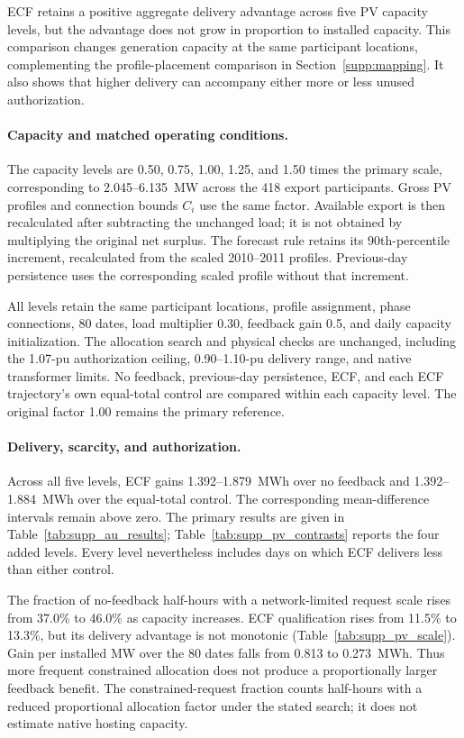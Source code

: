 \documentclass[11pt]{article}
\begin{document}
ECF retains a positive aggregate delivery advantage across five PV capacity
levels, but the advantage does not grow in proportion to installed capacity.
This comparison changes generation capacity at the same participant locations,
complementing the profile-placement comparison in Section~\ref{supp:mapping}.
It also shows that higher delivery can accompany either more or less unused
authorization.

\paragraph{Capacity and matched operating conditions.}
The capacity levels are 0.50, 0.75, 1.00, 1.25, and 1.50 times the primary
scale, corresponding to 2.045--6.135~MW across the 418 export participants.
Gross PV profiles and connection bounds $C_i$ use the same factor.
Available export is then recalculated after subtracting the unchanged load;
it is not obtained by multiplying the original net surplus. The forecast
rule retains its 90th-percentile increment, recalculated from the scaled
2010--2011 profiles. Previous-day persistence uses the corresponding scaled
profile without that increment.

All levels retain the same participant locations, profile assignment, phase
connections, 80 dates, load multiplier 0.30, feedback gain 0.5, and daily
capacity initialization. The allocation search and physical checks are
unchanged, including the 1.07-pu authorization ceiling, 0.90--1.10-pu delivery
range, and native transformer limits. No feedback, previous-day persistence,
ECF, and each ECF trajectory's own equal-total control are compared within
each capacity level. The original factor 1.00 remains the primary reference.

\paragraph{Delivery, scarcity, and authorization.}
Across all five levels, ECF gains 1.392--1.879~MWh over no feedback and
1.392--1.884~MWh over the equal-total control. The corresponding mean-difference
intervals remain above zero. The primary results are given in
Table~\ref{tab:supp_au_results}; Table~\ref{tab:supp_pv_contrasts} reports
the four added levels. Every level nevertheless includes days on which ECF
delivers less than either control.

The fraction of no-feedback half-hours with a network-limited request scale
rises from 37.0\% to 46.0\% as capacity increases. ECF qualification rises
from 11.5\% to 13.3\%, but its delivery advantage is not monotonic
(Table~\ref{tab:supp_pv_scale}). Gain per installed MW over the 80 dates falls
from 0.813 to 0.273~MWh. Thus more frequent constrained allocation does not
produce a proportionally larger feedback benefit. The constrained-request
fraction counts half-hours with a reduced proportional allocation factor
under the stated search; it does not estimate native hosting capacity.
\end{document}
